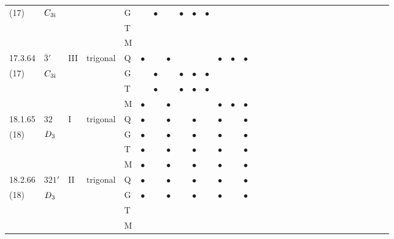 \documentclass[fleqn,9pt,landscape]{jsarticle}
\begin{document}
\begin{longtable}{lllll|l|l|l|l|l|l|l|l|l|ll|ll|ll|ll|ll|ll|ll|ll}
(17) & $C_{\rm 3i}$ &  &  & G &  & $\bullet$ &  & $\bullet$ & $\bullet$ & $\bullet$ &  &  &  &  &  &  &  &  &  &  &  &  &  &  &  &  &  &  &  \\
 &  &  &  & T &  &  &  &  &  &  &  &  &  &  &  &  &  &  &  &  &  &  &  &  &  &  &  &  &  \\
 &  &  &  & M &  &  &  &  &  &  &  &  &  &  &  &  &  &  &  &  &  &  &  &  &  &  &  &  &  \\ \hline
17.3.64 & \texttt{$\bar{3}'$} & III & trigonal & Q & $\bullet$ &  & $\bullet$ &  &  &  & $\bullet$ & $\bullet$ & $\bullet$ &  &  &  &  &  &  &  &  &  &  &  &  &  &  &  &  \\
(17) & $C_{\rm 3i}$ &  &  & G &  & $\bullet$ &  & $\bullet$ & $\bullet$ & $\bullet$ &  &  &  &  &  &  &  &  &  &  &  &  &  &  &  &  &  &  &  \\
 &  &  &  & T &  & $\bullet$ &  & $\bullet$ & $\bullet$ & $\bullet$ &  &  &  &  &  &  &  &  &  &  &  &  &  &  &  &  &  &  &  \\
 &  &  &  & M & $\bullet$ &  & $\bullet$ &  &  &  & $\bullet$ & $\bullet$ & $\bullet$ &  &  &  &  &  &  &  &  &  &  &  &  &  &  &  &  \\ \hline
18.1.65 & \texttt{$32$} & I & trigonal & Q & $\bullet$ &  & $\bullet$ &  & $\bullet$ &  & $\bullet$ &  & $\bullet$ &  &  &  &  &  &  &  &  &  &  &  &  &  &  &  &  \\
(18) & $D_{\rm 3}$ &  &  & G & $\bullet$ &  & $\bullet$ &  & $\bullet$ &  & $\bullet$ &  & $\bullet$ &  &  &  &  &  &  &  &  &  &  &  &  &  &  &  &  \\
 &  &  &  & T & $\bullet$ &  & $\bullet$ &  & $\bullet$ &  & $\bullet$ &  & $\bullet$ &  &  &  &  &  &  &  &  &  &  &  &  &  &  &  &  \\
 &  &  &  & M & $\bullet$ &  & $\bullet$ &  & $\bullet$ &  & $\bullet$ &  & $\bullet$ &  &  &  &  &  &  &  &  &  &  &  &  &  &  &  &  \\ \hline
18.2.66 & \texttt{$321'$} & II & trigonal & Q & $\bullet$ &  & $\bullet$ &  & $\bullet$ &  & $\bullet$ &  & $\bullet$ &  &  &  &  &  &  &  &  &  &  &  &  &  &  &  &  \\
(18) & $D_{\rm 3}$ &  &  & G & $\bullet$ &  & $\bullet$ &  & $\bullet$ &  & $\bullet$ &  & $\bullet$ &  &  &  &  &  &  &  &  &  &  &  &  &  &  &  &  \\
 &  &  &  & T &  &  &  &  &  &  &  &  &  &  &  &  &  &  &  &  &  &  &  &  &  &  &  &  &  \\
 &  &  &  & M &  &  &  &  &  &  &  &  &  &  &  &  &  &  &  &  &  &  &  &  &  &  &  &  &  \\ \hline

\end{longtable}
\end{document}
